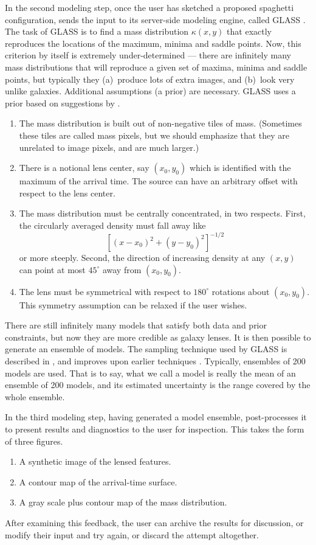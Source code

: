 In the second modeling step, once the user has sketched a proposed
spaghetti configuration, \spl sends the input to its server-side
modeling engine, called GLASS \citep{2014arXiv1401.7990C}.  The task
of GLASS is to find a mass distribution $\kappa(x,y)$ that exactly
reproduces the locations of the maximum, minima and saddle
points. Now, this criterion by itself is extremely under-determined
--- there are infinitely many mass distributions that will reproduce a
given set of maxima, minima and saddle points, but typically they
(a)~produce lots of extra images, and (b)~look very unlike galaxies.
Additional assumptions (a prior) are necessary.  GLASS uses a prior
based on suggestions by \cite{1997MNRAS.292..148S}.
\begin{enumerate}
\item The mass distribution is built out of non-negative tiles of
  mass.  (Sometimes these tiles are called mass pixels, but we should
  emphasize that they are unrelated to image pixels, and are much
  larger.)
\item There is a notional lens center, say $(x_0,y_0)$ which is
  identified with the maximum of the arrival time.  The source can
  have an arbitrary offset with respect to the lens center.
\item The mass distribution must be centrally concentrated, in two
  respects.  First, the circularly averaged density must fall away
  like $$ \left[(x-x_0)^2+(y-y_0)^2\right]^{-1/2}$$ or more steeply.
  Second, the direction of increasing density at any $(x,y)$ can point
  at most $45^\circ$ away from $(x_0,y_0)$.
\item The lens must be symmetrical with respect to $180^\circ$ rotations
  about $(x_0,y_0)$.  This symmetry assumption can be relaxed if the
  user wishes.
\end{enumerate}
There are still infinitely many models that satisfy both data and
prior constraints, but now they are more credible as galaxy lenses.
It is then possible to generate an ensemble of models.  The sampling
technique used by GLASS is described in \citep{Lubini2012}, and
improves upon earlier techniques \citep{2000AJ....119..439W,Saha2004}.
Typically, ensembles of 200 models are used.  That is to say, what we
call a \spl model is really the mean of an ensemble of 200 models, and
its estimated uncertainty is the range covered by the whole ensemble.

In the third modeling step, having generated a model ensemble, \spl
post-processes it to present results and diagnostics to the user for
inspection. This takes the form of three figures.
\begin{enumerate}
\item A synthetic image of the lensed features.
\item A contour map of the arrival-time surface.
\item A gray scale plus contour map of the mass distribution.
\end{enumerate}
After examining this feedback, the user can archive the results for
discussion, or modify their input and try again, or discard the
attempt altogether.

